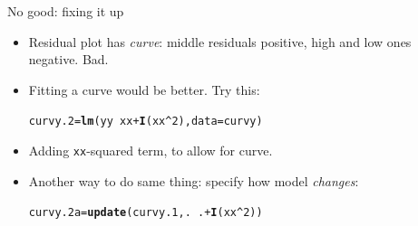 \documentclass[unknownkeysallowed]{beamer}\usepackage[]{graphicx}\usepackage[]{color}
\makeatletter
\newcommand{\hlnum}[1]{\textcolor[rgb]{0.686,0.059,0.569}{#1}}%
\newcommand{\hlopt}[1]{\textcolor[rgb]{0,0,0}{#1}}%
\newcommand{\hlstd}[1]{\textcolor[rgb]{0.345,0.345,0.345}{#1}}%
\newcommand{\hlkwb}[1]{\textcolor[rgb]{0.69,0.353,0.396}{#1}}%
\newcommand{\hlkwc}[1]{\textcolor[rgb]{0.333,0.667,0.333}{#1}}%
\newcommand{\hlkwd}[1]{\textcolor[rgb]{0.737,0.353,0.396}{\textbf{#1}}}%
\newenvironment{kframe}{%
 \def\at@end@of@kframe{}%
 \ifinner\ifhmode%
  \def\at@end@of@kframe{\end{minipage}}%
  \begin{minipage}{\columnwidth}%
 \fi\fi%
 \def\FrameCommand##1{\hskip\@totalleftmargin \hskip-\fboxsep
 \colorbox{shadecolor}{##1}\hskip-\fboxsep
     \hskip-\linewidth \hskip-\@totalleftmargin \hskip\columnwidth}%
 \MakeFramed {\advance\hsize-\width
   \@totalleftmargin\z@ \linewidth\hsize
   \@setminipage}}%
 {\par\unskip\endMakeFramed%
 \at@end@of@kframe}
\newenvironment{knitrout}{}{} %
\makeatother
\begin{document}
\begin{frame}[fragile]{No good: fixing it up}

  \begin{itemize}
  \item Residual plot has {\em curve}: middle residuals positive, high and low ones negative. Bad.
  \item Fitting a curve would be better. Try this:
  



\begin{knitrout}
\color{fgcolor}\begin{kframe}
\begin{alltt}
\hlstd{curvy.2}\hlkwb{=}\hlkwd{lm}\hlstd{(yy}\hlopt{~}\hlstd{xx}\hlopt{+}\hlkwd{I}\hlstd{(xx}\hlopt{^}\hlnum{2}\hlstd{),}\hlkwc{data}\hlstd{=curvy)}
\end{alltt}
\end{kframe}
\end{knitrout}

\item Adding \texttt{xx}-squared term, to allow for curve.
  
  
\item Another way to do same thing: specify how model \emph{changes}:
  
\begin{knitrout}
\color{fgcolor}\begin{kframe}
\begin{alltt}
\hlstd{curvy.2a}\hlkwb{=}\hlkwd{update}\hlstd{(curvy.1,.}\hlopt{~}\hlstd{.}\hlopt{+}\hlkwd{I}\hlstd{(xx}\hlopt{^}\hlnum{2}\hlstd{))}
\end{alltt}
\end{kframe}
\end{knitrout}
  
  \end{itemize}


\end{frame}
\end{document}
